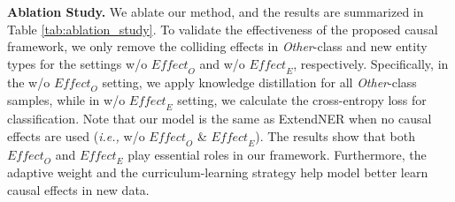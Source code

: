 \documentclass[11pt]{article}
\begin{document}
\begin{table}[htbp]
  \tiny
  \centering
  \caption{The ablation study of our method on three datasets in the setting FG-1-PG-1. \textit{AW}: adaptive weight; \textit{CuL}: curriculum learning strategy; \textit{Mi-F1}: micro-F1; \textit{Ma-F1}: macro-F1.}
  \label{tab:ablation_study}\end{table}

\noindent\textbf{Ablation Study.}\quad
We ablate our method, and the results are summarized in Table \ref{tab:ablation_study}.
To validate the effectiveness of the proposed causal framework, we only remove the colliding effects in \textit{Other}-class and new entity types for the settings w/o $\textit{Effect}_O$ and w/o $\textit{Effect}_E$, respectively.
Specifically, in the w/o $\textit{Effect}_O$ setting, we apply knowledge distillation for all \textit{Other}-class samples, while in w/o $\textit{Effect}_E$ setting, we calculate the cross-entropy loss for classification.
Note that our model is the same as ExtendNER when no causal effects are used (\textit{i.e.,} w/o $\textit{Effect}_O$ \& $\textit{Effect}_E$).
The results show that both $\textit{Effect}_O$ and $\textit{Effect}_E$ play essential roles in our framework.
Furthermore, the adaptive weight and the curriculum-learning strategy help model better learn causal effects in new data.
\end{document}
